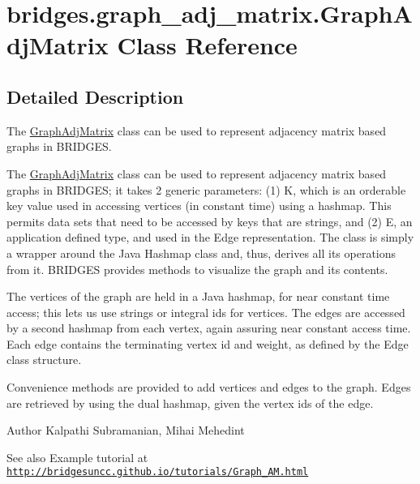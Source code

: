 \hypertarget{classbridges_1_1graph__adj__matrix_1_1_graph_adj_matrix}{}\section{bridges.\+graph\+\_\+adj\+\_\+matrix.\+Graph\+Adj\+Matrix Class Reference}
\label{classbridges_1_1graph__adj__matrix_1_1_graph_adj_matrix}


\subsection{Detailed Description}
The \hyperlink{classbridges_1_1graph__adj__matrix_1_1_graph_adj_matrix}{Graph\+Adj\+Matrix} class can be used to represent adjacency matrix based graphs in B\+R\+I\+D\+G\+ES. 

The \hyperlink{classbridges_1_1graph__adj__matrix_1_1_graph_adj_matrix}{Graph\+Adj\+Matrix} class can be used to represent adjacency matrix based graphs in B\+R\+I\+D\+G\+ES; it takes 2 generic parameters\+: (1) K, which is an orderable key value used in accessing vertices (in constant time) using a hashmap. This permits data sets that need to be accessed by keys that are strings, and (2) E, an application defined type, and used in the Edge representation. The class is simply a wrapper around the Java Hashmap class and, thus, derives all its operations from it. B\+R\+I\+D\+G\+ES provides methods to visualize the graph and its contents.

The vertices of the graph are held in a Java hashmap, for near constant time access; this lets us use strings or integral ids for vertices. The edges are accessed by a second hashmap from each vertex, again assuring near constant access time. Each edge contains the terminating vertex id and weight, as defined by the Edge class structure.

Convenience methods are provided to add vertices and edges to the graph. Edges are retrieved by using the dual hashmap, given the vertex ids of the edge.

\begin{DoxyAuthor}{Author}
Kalpathi Subramanian, Mihai Mehedint
\end{DoxyAuthor}
\begin{DoxySeeAlso}{See also}
Example tutorial at \href{http://bridgesuncc.github.io/tutorials/Graph_AM.html}{\tt http\+://bridgesuncc.\+github.\+io/tutorials/\+Graph\+\_\+\+A\+M.\+html} 
\end{DoxySeeAlso}
